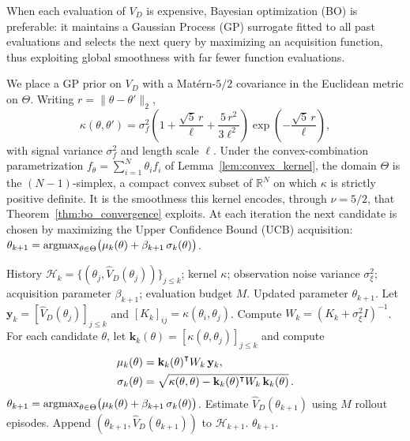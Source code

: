 \documentclass[12pt]{article}
\newcommand\raiseT[2]{\raisebox{0.25ex}{$#1#2$}
}
\newcommand{\argmax}{\mathop{\rm argmax}}
\renewcommand{\[}{\left[}
\renewcommand{\]}{\right]}
\renewcommand{\(}{\left(}
\renewcommand{\)}{\right)}
\newcounter{l1}
\newcounter{l2}
\newcounter{l3}
\renewcommand{\top}{{\mathpalette\raiseT\intercal}}
\begin{document}
When each evaluation of $V_D$ is expensive, Bayesian optimization (BO) is preferable:
it maintains a Gaussian Process (GP) surrogate fitted to all past evaluations and
selects the next query by maximizing an acquisition function, thus exploiting global
smoothness with far fewer function evaluations.

We place a GP prior on $V_D$ with a Mat\'{e}rn-$5/2$ covariance in the Euclidean metric
on $\Theta$. Writing $r = \|\theta - \theta'\|_2$,
\begin{equation*}
  \kappa(\theta,\theta')
  = \sigma_f^2
    \!\left(1 + \frac{\sqrt{5}\,r}{\ell} + \frac{5\,r^2}{3\ell^2}\right)
    \exp\!\left(-\frac{\sqrt{5}\,r}{\ell}\right),
\end{equation*}
with signal variance $\sigma_f^2$ and length scale $\ell$. Under the convex-combination
parametrization $f_\theta = \sum_{i=1}^N \theta_i f_i$ of
Lemma~\ref{lem:convex_kernel}, the domain $\Theta$ is the $(N-1)$-simplex, a compact
convex subset of $\mathbb{R}^N$ on which $\kappa$ is strictly positive definite. It is
the smoothness this kernel encodes, through $\nu = 5/2$, that
Theorem~\ref{thm:bo_convergence} exploits. At each iteration the next candidate is chosen
by maximizing the Upper Confidence Bound (UCB) acquisition:
$\theta_{k+1} = \argmax_{\theta\in\Theta}
  \bigl(\mu_k(\theta) + \beta_{k+1}\,\sigma_k(\theta)\bigr)$.

\begin{algorithm}[t]
\caption{\textsc{StepOptimize} via Bayesian Optimization (BO)}
\label{alg:bo}
\begin{algorithmic}[1]
\Require History $\mathcal{H}_{k} = \{(\theta_j,\widehat{V}_D(\theta_j))\}_{j \le k}$;
  kernel $\kappa$; observation noise variance $\sigma_\xi^2$;
  acquisition parameter $\beta_{k+1}$; evaluation budget $M$.
\Ensure Updated parameter $\theta_{k+1}$.
\State Let $\mathbf{y}_k = [\widehat{V}_D(\theta_j)]_{j \le k}$ and
  $[K_k]_{ij} = \kappa(\theta_i,\theta_j)$.
\State Compute $W_k = (K_k + \sigma_\xi^2 I)^{-1}$.
\State For each candidate $\theta$, let
  $\mathbf{k}_k(\theta) = [\kappa(\theta,\theta_j)]_{j\le k}$ and compute
  \vspace{-2pt}
  \begin{align*}
    \mu_k(\theta) &= \mathbf{k}_k(\theta)^\top W_k\,\mathbf{y}_k,\\
    \sigma_k(\theta) &= \sqrt{\kappa(\theta,\theta)
      - \mathbf{k}_k(\theta)^\top W_k\,\mathbf{k}_k(\theta)}\,.
  \end{align*}
\State $\theta_{k+1} = \argmax_{\theta \in \Theta}
  \bigl(\mu_k(\theta) + \beta_{k+1}\,\sigma_k(\theta)\bigr)$.
\State Estimate $\widehat{V}_D(\theta_{k+1})$ using $M$ rollout episodes.
\State Append $(\theta_{k+1}, \widehat{V}_D(\theta_{k+1}))$ to $\mathcal{H}_{k+1}$.
\State \Return $\theta_{k+1}$.
\end{algorithmic}
\end{algorithm}
\end{document}
